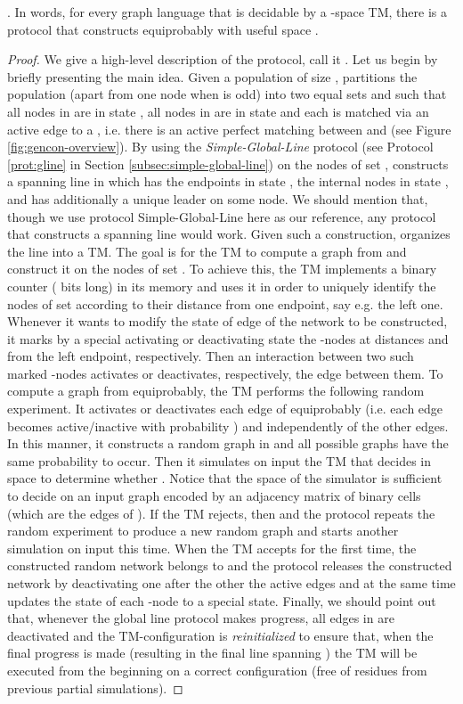 \documentclass[oribibl, 11pt]{llncs}
\begin{document}
\begin{theorem}  \label{the:gencon-half}
. In words, for every graph language  that is decidable by a -space TM, there is a protocol that constructs  equiprobably with useful space .
\end{theorem}
\begin{proof}
We give a high-level description of the protocol, call it . Let us begin by briefly presenting the main idea. Given a population of size ,  partitions the population (apart from one node when  is odd) into two equal sets  and  such that all nodes in  are in state , all nodes in  are in state  and each  is matched via an active edge to a , i.e. there is an active perfect matching between  and  (see Figure \ref{fig:gencon-overview}). By using the \emph{Simple-Global-Line} protocol (see Protocol \ref{prot:gline} in Section \ref{subsec:simple-global-line}) on the nodes of set ,  constructs a spanning line in  which has the endpoints in state , the internal nodes in state , and has additionally a unique leader on some node. We should mention that, though we use protocol Simple-Global-Line here as our reference, any protocol that constructs a spanning line would work. Given such a construction,  organizes the line into a TM. The goal is for the TM to compute a graph from  and construct it on the nodes of set . To achieve this, the TM implements a binary counter ( bits long) in its memory and uses it in order to uniquely identify the nodes of set  according to their distance from one endpoint, say e.g. the left one. Whenever it wants to modify the state of edge  of the network to be constructed, it marks by a special activating or deactivating state the -nodes at distances  and  from the left endpoint, respectively. Then an interaction between two such marked -nodes activates or deactivates, respectively, the edge between them. To compute a graph from  equiprobably, the TM performs the following random experiment. It activates or deactivates each edge of  equiprobably (i.e. each edge becomes active/inactive with probability ) and independently of the other edges. In this manner, it constructs a random graph  in  and all possible graphs have the same probability to occur. Then it simulates on input  the TM that decides  in  space to determine whether . Notice that the  space of the simulator is sufficient to decide on an input graph encoded by an adjacency matrix of  binary cells (which are the edges of ). If the TM rejects, then  and the protocol repeats the random experiment to produce a new random graph  and starts another simulation on input  this time. When the TM accepts for the first time, the constructed random network belongs to  and the protocol releases the constructed network by deactivating one after the other the active  edges and at the same time updates the state of each -node to a special  state. Finally, we should point out that, whenever the global line protocol makes progress, all edges in  are deactivated and the TM-configuration is \emph{reinitialized} to ensure that, when the final progress is made (resulting in the final line spanning ) the TM will be executed from the beginning on a correct configuration (free of residues from previous partial simulations).


\end{proof}
\end{document}

